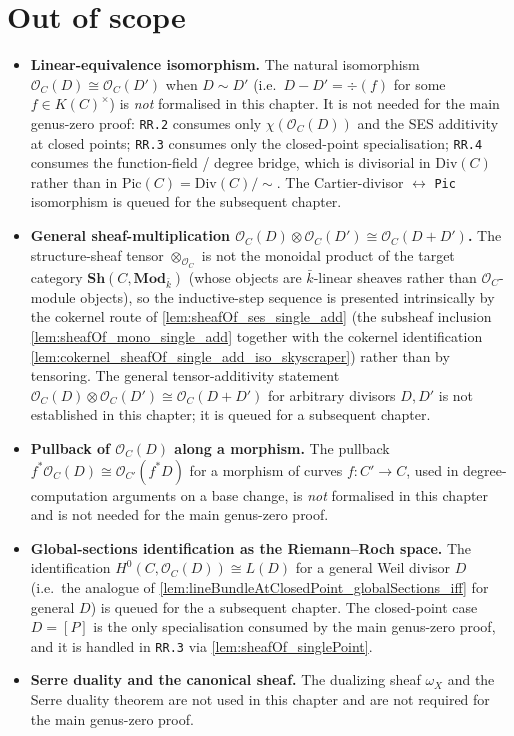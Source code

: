\section{Out of scope}

\begin{itemize}
  \item \textbf{Linear-equivalence isomorphism.} The natural
    isomorphism \(\mathcal O_C(D) \cong \mathcal O_C(D')\) when
    \(D \sim D'\) (i.e.\ \(D - D' = \div(f)\) for some
    \(f \in K(C)^{\times}\)) is \emph{not} formalised in this chapter.
    It is not needed for the main genus-zero proof: \texttt{RR.2}
    consumes only \(\chi(\mathcal O_C(D))\) and the SES additivity at
    closed points; \texttt{RR.3} consumes only the closed-point
    specialisation; \texttt{RR.4} consumes the function-field /
    degree bridge, which is divisorial in \(\mathrm{Div}(C)\) rather than
    in \(\mathrm{Pic}(C) = \mathrm{Div}(C) / \sim\). The
    Cartier-divisor \(\leftrightarrow\) \texttt{Pic} isomorphism is
    queued for the subsequent chapter.
  \item \textbf{General sheaf-multiplication
    $\mathcal O_C(D) \otimes \mathcal O_C(D') \cong \mathcal O_C(D +
    D')$.} The structure-sheaf tensor $\otimes_{\mathcal O_C}$ is not the
    monoidal product of the target category
    \(\mathbf{Sh}(C, \mathbf{Mod}_{\bar k})\) (whose objects are
    \(\bar k\)-linear sheaves rather than \(\mathcal O_C\)-module objects),
    so the inductive-step sequence is presented intrinsically by the
    cokernel route of \cref{lem:sheafOf_ses_single_add} (the subsheaf
    inclusion \cref{lem:sheafOf_mono_single_add} together with the cokernel
    identification \cref{lem:cokernel_sheafOf_single_add_iso_skyscraper})
    rather than by tensoring. The general tensor-additivity statement
    $\mathcal O_C(D) \otimes \mathcal O_C(D') \cong \mathcal O_C(D + D')$
    for arbitrary divisors \(D, D'\) is not established in this chapter;
    it is queued for a subsequent chapter.
  \item \textbf{Pullback of \(\mathcal O_C(D)\) along a morphism.} The
    pullback \(f^* \mathcal O_C(D) \cong \mathcal O_{C'}(f^* D)\) for
    a morphism of curves \(f : C' \to C\), used in degree-computation
    arguments on a base change, is \emph{not} formalised in this
    chapter and is not needed for the main genus-zero proof.
  \item \textbf{Global-sections identification as the Riemann--Roch
    space.} The identification
    \(H^0(C, \mathcal O_C(D)) \cong L(D)\) for a general Weil divisor
    \(D\) (i.e.\ the analogue of
    \cref{lem:lineBundleAtClosedPoint_globalSections_iff} for general
    \(D\)) is queued for the a subsequent chapter. The closed-point
    case \(D = [P]\) is the only specialisation consumed by the
    main genus-zero proof, and it is handled in
    \texttt{RR.3} via \cref{lem:sheafOf_singlePoint}.
  \item \textbf{Serre duality and the canonical sheaf.} The dualizing
    sheaf \(\omega_X\) and the Serre duality theorem are not used in this
    chapter and are not required for the main genus-zero proof.
\end{itemize}
